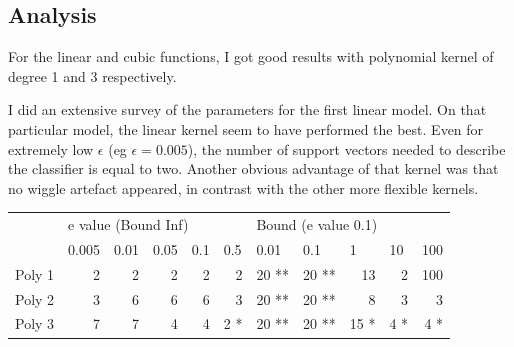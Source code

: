 \documentclass[11pt, a4paper]{article}
\begin{document}
\subsection{Analysis}

For the linear and cubic functions, I got good results with polynomial
kernel of degree 1 and 3 respectively.

I did an extensive survey of the parameters for the first linear
model. On that particular model, the linear kernel seem to have
performed the best. Even for extremely low $\epsilon$ (eg
$\epsilon=0.005$), the number of support vectors needed to describe
the classifier is equal to two. Another obvious advantage of that
kernel was that no wiggle artefact appeared, in contrast with the
other more flexible kernels.

\begin{table}[H]
  \centering
  \begin{tabular}{l|r|r|r|r|r|r|r|r|r|r|}
\cline{2-11}
                                         & \multicolumn{5}{l|}{e value (Bound Inf)}                                                                                                 & \multicolumn{5}{l|}{Bound (e value 0.1)}                                                                                           \\ \cline{2-11} 
                                         & \multicolumn{1}{l|}{0.005} & \multicolumn{1}{l|}{0.01} & \multicolumn{1}{l|}{0.05} & \multicolumn{1}{l|}{0.1} & \multicolumn{1}{l|}{0.5} & \multicolumn{1}{l|}{0.01} & \multicolumn{1}{l|}{0.1} & \multicolumn{1}{l|}{1} & \multicolumn{1}{l|}{10} & \multicolumn{1}{l|}{100} \\ \hline
\multicolumn{1}{|l|}{Poly 1}             & 2                          & 2                         & 2                         & 2                        & 2                        & 20 **                     & 20 **                    & 13                     & 2                       & 100                      \\ \hline
\multicolumn{1}{|l|}{Poly 2}             & 3                          & 6                         & 6                         & 6                        & 3                        & 20 **                     & 20 **                    & 8                      & 3                       & 3                        \\ \hline
\multicolumn{1}{|l|}{Poly 3}             & 7                          & 7                         & 4                         & 4                        & 2 *                      & 20 **                     & 20 **                    & 15 *                   & 4 *                     & 4 *                      \\ \hline

\end{tabular}
\end{table}
\end{document}
